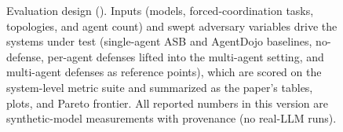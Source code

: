 \begin{figure}[t]
{}
\caption{Evaluation design (). Inputs (models, forced-coordination tasks,
topologies, and agent count) and swept adversary variables drive the systems under test
(single-agent ASB and AgentDojo baselines, no-defense, per-agent defenses lifted into the
multi-agent setting, and multi-agent defenses as reference points), which are scored on the
system-level metric suite and summarized as the paper's tables, plots, and Pareto frontier.
All reported numbers in this version are synthetic-model measurements with provenance
(no real-LLM runs).}
\label{fig:expsetup}
\end{figure}
